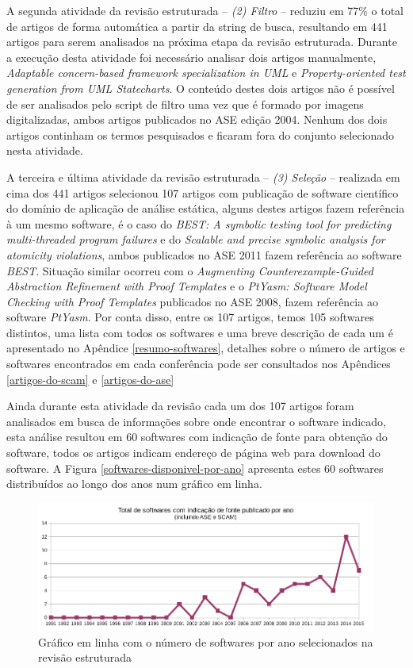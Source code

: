 A segunda atividade da revisão estruturada -- {\it (2) Filtro} -- reduziu em 77\%
o total de artigos de forma automática a partir da string de busca, resultando em 441 artigos
para serem analisados na próxima etapa da revisão estruturada.  Durante a execução desta
atividade foi necessário analisar dois artigos manualmente, {\it Adaptable
concern-based framework specialization in UML} e {\it Property-oriented test
generation from UML Statecharts}. O conteúdo destes dois artigos não é possível
de ser analisados pelo script de filtro uma vez que é formado por imagens
digitalizadas, ambos artigos publicados no ASE edição 2004. Nenhum dos dois
artigos continham os termos pesquisados e ficaram fora do conjunto selecionado
nesta atividade.

A terceira e última atividade da revisão estruturada -- {\it (3) Seleção} --
realizada em cima dos 441 artigos selecionou 107 artigos com publicação de
software científico do domínio de aplicação de análise estática, alguns destes
artigos fazem referência à um mesmo software, é o caso do {\it BEST: A symbolic
testing tool for predicting multi-threaded program failures} e do {\it Scalable
and precise symbolic analysis for atomicity violations}, ambos publicados no
ASE 2011 fazem referência ao software {\it BEST}. Situação similar ocorreu com o {\it Augmenting
Counterexample-Guided Abstraction Refinement with Proof Templates} e o {\it
PtYasm: Software Model Checking with Proof Templates} publicados no ASE 2008,
fazem referência ao software {\it PtYasm}. Por conta disso, entre os 107 artigos, temos
105 softwares distintos, uma lista com todos os softwares e uma breve descrição
de cada um é apresentado no Apêndice \ref{resumo-softwares},
detalhes sobre o número de artigos e softwares encontrados em cada conferência
pode ser consultados nos Apêndices \ref{artigos-do-scam} e \ref{artigos-do-ase} 

Ainda durante esta atividade da revisão cada um dos 107 artigos foram
analisados em busca de informações sobre onde encontrar o software indicado,
esta análise resultou em 60 softwares com indicação de fonte para obtenção do
software, todos os artigos indicam endereço de página web para download do
software. A Figura \ref{softwares-disponivel-por-ano} apresenta estes 60
softwares distribuídos ao longo dos anos num gráfico em linha.

\begin{figure}[h]
  \center
  \includegraphics[scale=0.65]{imagens/softwares-por-ano.png}
  \caption{Gráfico em linha com o número de softwares por ano selecionados na revisão estruturada}
  \label{softwares-por-ano}
\end{figure}

